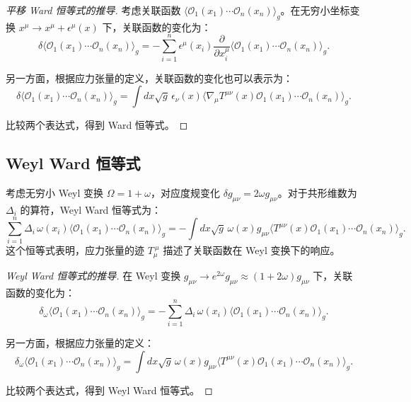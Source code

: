 \begin{proof}[平移 Ward 恒等式的推导]
考虑关联函数 $\langle \mathcal{O}_1(x_1) \cdots \mathcal{O}_n(x_n) \rangle_g$。在无穷小坐标变换 $x^\mu \to x^\mu + \epsilon^\mu(x)$ 下，关联函数的变化为：
\begin{equation}
    \delta \langle \mathcal{O}_1(x_1) \cdots \mathcal{O}_n(x_n) \rangle_g = -\sum_{i=1}^n \epsilon^\mu(x_i) \frac{\partial}{\partial x_i^\mu} \langle \mathcal{O}_1(x_1) \cdots \mathcal{O}_n(x_n) \rangle_g.
\end{equation}

另一方面，根据应力张量的定义，关联函数的变化也可以表示为：
\begin{equation}
    \delta \langle \mathcal{O}_1(x_1) \cdots \mathcal{O}_n(x_n) \rangle_g = \int dx \sqrt{g} \, \epsilon_\nu(x) \langle \nabla_\mu T^{\mu\nu}(x) \mathcal{O}_1(x_1) \cdots \mathcal{O}_n(x_n) \rangle_g.
\end{equation}

比较两个表达式，得到 Ward 恒等式。
\end{proof}

\subsection{Weyl Ward 恒等式}

\begin{theorem}
考虑无穷小 Weyl 变换 $\Omega = 1 + \omega$，对应度规变化 $\delta g_{\mu\nu} = 2\omega g_{\mu\nu}$。对于共形维数为 $\Delta_i$ 的算符，Weyl Ward 恒等式为：
\begin{equation}
    \sum_{i=1}^n \Delta_i \, \omega(x_i) \langle \mathcal{O}_1(x_1) \cdots \mathcal{O}_n(x_n) \rangle_g = -\int dx \sqrt{g} \, \omega(x) g_{\mu\nu} \langle T^{\mu\nu}(x) \mathcal{O}_1(x_1) \cdots \mathcal{O}_n(x_n) \rangle_g.
\end{equation}
这个恒等式表明，应力张量的迹 $T_\mu^{~\mu}$ 描述了关联函数在 Weyl 变换下的响应。
\end{theorem}

\begin{proof}[Weyl Ward 恒等式的推导]
在 Weyl 变换 $g_{\mu\nu} \to e^{2\omega} g_{\mu\nu} \approx (1+2\omega) g_{\mu\nu}$ 下，关联函数的变化为：
\begin{equation}
    \delta_\omega \langle \mathcal{O}_1(x_1) \cdots \mathcal{O}_n(x_n) \rangle_g = -\sum_{i=1}^n \Delta_i \, \omega(x_i) \langle \mathcal{O}_1(x_1) \cdots \mathcal{O}_n(x_n) \rangle_g.
\end{equation}

另一方面，根据应力张量的定义：
\begin{equation}
    \delta_\omega \langle \mathcal{O}_1(x_1) \cdots \mathcal{O}_n(x_n) \rangle_g = \int dx \sqrt{g} \, \omega(x) g_{\mu\nu} \langle T^{\mu\nu}(x) \mathcal{O}_1(x_1) \cdots \mathcal{O}_n(x_n) \rangle_g.
\end{equation}

比较两个表达式，得到 Weyl Ward 恒等式。
\end{proof}

